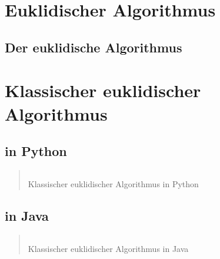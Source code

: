 \documentclass[12pt, 
               a4paper, 
               openright,
               parskip=full, 
               chapterentrydots=true,
               listof=entryprefix,
               numbers=endperiod]{scrbook}
\begin{document}
%
%
 
\thispagestyle{empty}

%
%
\newpage
\tableofcontents

\chapter{Euklidischer Algorithmus}
\newpage
\section{Der euklidische Algorithmus}
 

\chapter{Klassischer euklidischer Algorithmus}
\newpage
\thispagestyle{empty}
\mbox{}
\newpage
\section{in Python}
\begin{listing}[!ht]
\begin{quote}
\renewcommand{\theFancyVerbLine}{
  \sffamily\textcolor[rgb]{0.5,0.5,0.5}{\scriptsize\arabic{FancyVerbLine}}}

\inputminted[linenos, breaklines, numbersep=5pt, tabsize=4, frame=leftline]{python}{./listings/ggT.py}
\caption{Klassischer euklidischer Algorithmus in Python}
\end{quote}
\end{listing}

\newpage
\section{in Java}
\begin{listing}[!ht]
\begin{quote}
\renewcommand{\theFancyVerbLine}{
  \sffamily\textcolor[rgb]{0.5,0.5,0.5}{\scriptsize\arabic{FancyVerbLine}}}

\inputminted[linenos, breaklines, numbersep=5pt, tabsize=4, frame=leftline]{java}{./listings/ggT.java}
\caption{Klassischer euklidischer Algorithmus in Java}
\end{quote}
\end{listing}
\end{document}
